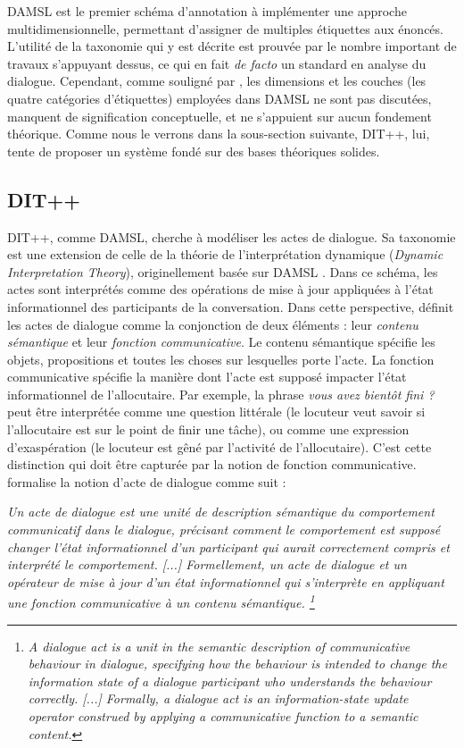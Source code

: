 \documentclass[10pt,a4paper,twoside]{article}
\begin{document}
DAMSL est le premier schéma d'annotation à implémenter une approche multidimensionnelle, permettant d'assigner de multiples étiquettes aux énoncés. L'utilité de la taxonomie qui y est décrite est prouvée par le nombre important de travaux s'appuyant dessus, ce qui en fait \textit{de facto} un standard en analyse du dialogue. Cependant, comme souligné par \citet{bunt2006dimensions}, les dimensions et les \og couches \fg{} (les quatre catégories d'étiquettes) employées dans DAMSL ne sont pas discutées, manquent de signification conceptuelle, et ne s'appuient sur aucun fondement théorique. Comme nous le verrons dans la sous-section suivante, DIT++, lui, tente de proposer un système fondé sur des bases théoriques solides.

\subsection{DIT++}
\label{subsec:DIT}

DIT++, comme DAMSL, cherche à modéliser les actes de dialogue. Sa taxonomie est une extension de celle de la théorie de l'interprétation dynamique (\textit{Dynamic Interpretation Theory}), originellement basée sur DAMSL \cite{bunt2009dit++}. Dans ce schéma, les actes sont interprétés comme des opérations de mise à jour appliquées à l'état informationnel des participants de la conversation. Dans cette perspective, \citeauthor{bunt2009dit++} définit les actes de dialogue comme la conjonction de deux éléments : leur \textit{contenu sémantique} et leur \textit{fonction communicative}. Le contenu sémantique spécifie les objets, propositions et toutes les choses sur lesquelles porte l'acte. La fonction communicative spécifie la manière dont l'acte est supposé impacter l'état informationnel de l'allocutaire. Par exemple, la phrase \og \textit{vous avez bientôt fini ?} \fg{} peut être interprétée comme une question littérale (le locuteur veut savoir si l'allocutaire est sur le point de finir une tâche), ou comme une expression d'exaspération (le locuteur est gêné par l'activité de l'allocutaire). C'est cette distinction qui doit être capturée par la notion de fonction communicative. \citeauthor{bunt2006dimensions} formalise la notion d'acte de dialogue comme suit \cite[pg. 13]{bunt2009dit++} :

\begin{displayquote}
\og \textit{Un acte de dialogue est une unité de description sémantique du comportement communicatif dans le dialogue, précisant comment le comportement est supposé changer l'état informationnel d'un participant qui aurait correctement compris et interprété le comportement. [...] Formellement, un acte de dialogue et un opérateur de mise à jour d'un état informationnel qui s’interprète en appliquant une fonction communicative à un contenu sémantique. \footnote{\textit{\og A dialogue act is a unit in the semantic description of communicative behaviour in dialogue, specifying how the behaviour is intended to change the information state of a dialogue participant who understands the behaviour correctly. [...] Formally, a dialogue act is an information-state update operator construed by applying a communicative function to a semantic content.} \fg}} \fg
\end{displayquote}
\end{document}
